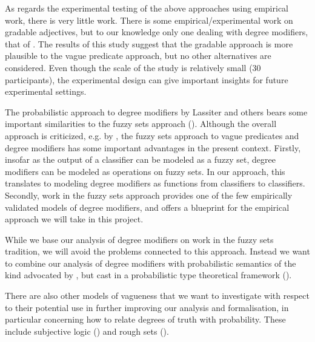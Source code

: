 \documentclass[11pt,a4paper]{article}
\begin{document}
As regards the experimental testing of the above approaches using empirical work, there is very little work. There is some empirical/experimental work on gradable adjectives, but to our knowledge only one dealing with degree modifiers, that of \cite{Mcnabb2012}. The results of this study suggest that the gradable approach is more plausible to the vague predicate approach, but no other alternatives are considered. Even though the scale of the study is relatively small (30 participants), the experimental design can give important insights for future experimental settings. 

The probabilistic approach to degree modifiers by Lassiter and others bears some important similarities to the fuzzy sets approach (). Although the overall approach is criticized, e.g. by \cite{klein:1980}, the fuzzy sets approach to vague predicates and degree modifiers has some important advantages in the present context. Firstly, insofar as the output of a classifier can be modeled as a fuzzy set,  degree modifiers can be modeled as operations on fuzzy sets. In our approach, this translates to modeling degree modifiers as functions from classifiers to classifiers. Secondly, work in the fuzzy sets approach provides one of the few empirically validated models of degree modifiers, and offers a blueprint for the empirical approach we will take in this project.


While we  base  our analysis of degree modifiers on work in the fuzzy sets tradition, we will avoid the problems connected to this approach. Instead we want to combine our analysis of degree modifiers with probabilistic semantics of the kind advocated by \cite{goodman2015probabilistic}\/, but cast in a probabilistic type theoretical framework ().

There are also other models of vagueness that we want to investigate with respect to their potential use in further improving our analysis  and formalisation, in particular concerning how to relate degrees of truth with probability. These include subjective logic () and  rough sets ().
\end{document}
